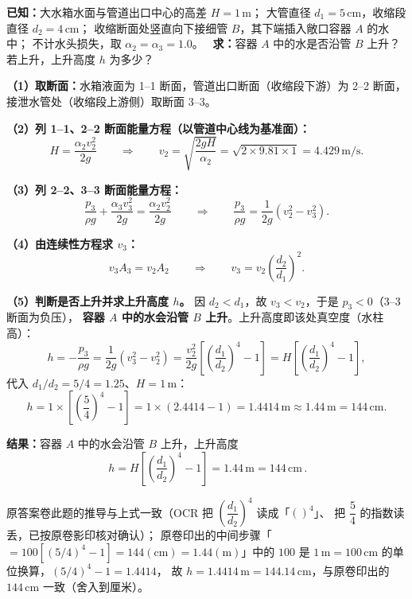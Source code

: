 \begin{jie}
\textbf{已知：}大水箱水面与管道出口中心的高差 $H=1\,\mathrm{m}$；
大管直径 $d_1=5\,\mathrm{cm}$，收缩段直径 $d_2=4\,\mathrm{cm}$；
收缩断面处竖直向下接细管 $B$，其下端插入敞口容器 $A$ 的水中；
不计水头损失，取 $\alpha_2=\alpha_3=1.0$。
\ \textbf{求：}容器 $A$ 中的水是否沿管 $B$ 上升？若上升，上升高度 $h$ 为多少？

\textbf{（1）取断面：}水箱液面为 1--1 断面，管道出口断面（收缩段下游）为 2--2 断面，
接泄水管处（收缩段上游侧）取断面 3--3。

\textbf{（2）列 1--1、2--2 断面能量方程（以管道中心线为基准面）：}
\[
H=\frac{\alpha_2v_2^{2}}{2g}
\qquad\Longrightarrow\qquad
v_2=\sqrt{\frac{2gH}{\alpha_2}}=\sqrt{2\times9.81\times1}=4.429\,\mathrm{m/s}.
\]

\textbf{（3）列 2--2、3--3 断面能量方程：}
\[
\frac{p_3}{\rho g}+\frac{\alpha_3v_3^{2}}{2g}=\frac{\alpha_2v_2^{2}}{2g}
\qquad\Longrightarrow\qquad
\frac{p_3}{\rho g}=\frac{1}{2g}\left(v_2^{2}-v_3^{2}\right).
\]

\textbf{（4）由连续性方程求 $v_3$：}
\[
v_3A_3=v_2A_2
\qquad\Longrightarrow\qquad
v_3=v_2\left(\frac{d_2}{d_1}\right)^{2}.
\]

\textbf{（5）判断是否上升并求上升高度 $h$。}
因 $d_2<d_1$，故 $v_3<v_2$，于是 $p_3<0$（3--3 断面为负压），
\textbf{容器 $A$ 中的水会沿管 $B$ 上升}。上升高度即该处真空度（水柱高）：
\[
h=-\frac{p_3}{\rho g}=\frac{1}{2g}\left(v_3^{2}-v_2^{2}\right)
=\frac{v_2^{2}}{2g}\left[\left(\frac{d_1}{d_2}\right)^{4}-1\right]
=H\left[\left(\frac{d_1}{d_2}\right)^{4}-1\right],
\]
代入 $d_1/d_2=5/4=1.25$、$H=1\,\mathrm{m}$：
\[
h=1\times\left[\left(\frac{5}{4}\right)^{4}-1\right]
=1\times(2.4414-1)=1.4414\,\mathrm{m}\approx1.44\,\mathrm{m}=144\,\mathrm{cm}.
\]

\textbf{结果：}容器 $A$ 中的水会沿管 $B$ 上升，上升高度
\[
\boxed{\,h=H\left[\left(\frac{d_1}{d_2}\right)^{4}-1\right]=1.44\,\mathrm{m}=144\,\mathrm{cm}\,}.
\]
\end{jie}

\begin{tishi}
原答案卷此题的推导与上式一致（OCR 把 $\left(\dfrac{d_1}{d_2}\right)^{4}$ 读成「$()^{4}$」、
把 $\dfrac{5}{4}$ 的指数读丢，已按原卷影印核对确认）；
原卷印出的中间步骤「$=100[(5/4)^{4}-1]=144(\mathrm{cm})=1.44(\mathrm{m})$」中的 $100$
是 $1\,\mathrm{m}=100\,\mathrm{cm}$ 的单位换算，$(5/4)^{4}-1=1.4414$，
故 $h=1.4414\,\mathrm{m}=144.14\,\mathrm{cm}$，与原卷印出的 $144\,\mathrm{cm}$ 一致（舍入到厘米）。
\end{tishi}

